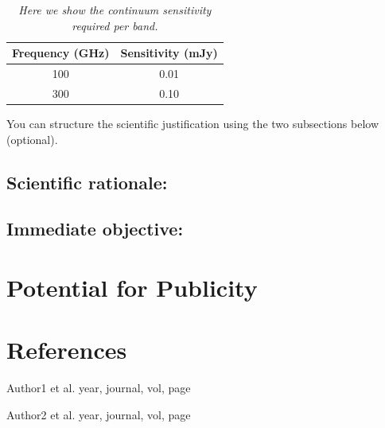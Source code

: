 \documentclass[12pt,a4paper]{article}  %
\begin{document}
\begin{table}[tbh]
\begin{center}
\caption[]{\em{Here we show the continuum sensitivity required per band.}}
\begin{tabular}{cc}
\hline \noalign {\smallskip}
Frequency (GHz) & Sensitivity (mJy) \\
\hline \noalign {\smallskip}
100 & 0.01 \\
300 & 0.10 \\
\end{tabular}
\end{center}
\end{table}

You can structure the scientific justification using the two subsections below (optional).

\subsection{Scientific rationale:}


\subsection{Immediate objective:}



\section{Potential for Publicity}




\section{References}


\noindent [1] Author1 et al. year, journal, vol, page

\noindent [2] Author2 et al. year, journal, vol, page


\end{document}

